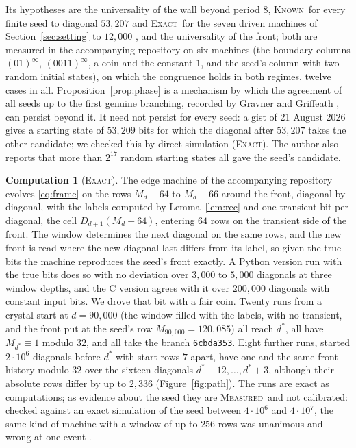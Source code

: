 \documentclass[11pt]{article}
\theoremstyle{definition}
\newtheorem{computation}[theorem]{Computation}
\theoremstyle{remark}
\newcommand{\EXACT}{\textsc{Exact}}
\newcommand{\MEASURED}{\textsc{Measured}}
\newcommand{\KNOWN}{\textsc{Known}}
\newcommand{\dstar}{d^{*}}
\begin{document}
Its hypotheses are the universality of the wall beyond period $8$, \KNOWN\ for every finite seed to diagonal $53{,}207$ \cite[\S8]{GG} and \EXACT\ for the seven driven machines of Section~\ref{sec:setting} to $12{,}000$ \cite{B}, and the universality of the front; both are measured in the accompanying repository on six machines (the boundary columns $(01)^\infty$, $(0011)^\infty$, a coin and the constant $1$, and the seed's column with two random initial states), on which the congruence holds in both regimes, twelve cases in all. Proposition~\ref{prop:phase} is a mechanism by which the agreement of all seeds up to the first genuine branching, recorded by Gravner and Griffeath \cite[\S8]{GG}, can persist beyond it. It need not persist for every seed: a gist of 21 August 2026 \cite{Lania} gives a starting state of $53{,}209$ bits for which the diagonal after $53{,}207$ takes the other candidate; we checked this by direct simulation (\EXACT). The author also reports that more than $2^{17}$ random starting states all gave the seed's candidate.

\begin{computation}[\EXACT]\label{comp:vote}
The edge machine of the accompanying repository evolves \eqref{eq:frame} on the rows $M_d-64$ to $M_d+66$ around the front, diagonal by diagonal, with the labels computed by Lemma~\ref{lem:rec} and one transient bit per diagonal, the cell $D_{d+1}(M_d-64)$, entering $64$ rows on the transient side of the front. The window determines the next diagonal on the same rows, and the new front is read where the new diagonal last differs from its label, so given the true bits the machine reproduces the seed's front exactly. A Python version run with the true bits does so with no deviation over $3{,}000$ to $5{,}000$ diagonals at three window depths, and the C version agrees with it over $200{,}000$ diagonals with constant input bits. We drove that bit with a fair coin. Twenty runs from a crystal start at $d=90{,}000$ (the window filled with the labels, with no transient, and the front put at the seed's row $M_{90{,}000}=120{,}085$) all reach $\dstar$, all have $M_{\dstar}\equiv1$ modulo $32$, and all take the branch \texttt{6cbda353}. Eight further runs, started $2\cdot10^6$ diagonals before $\dstar$ with start rows $7$ apart, have one and the same front history modulo $32$ over the sixteen diagonals $\dstar-12,\dots,\dstar+3$, although their absolute rows differ by up to $2{,}336$ (Figure~\ref{fig:path}). The runs are exact as computations; as evidence about the seed they are \MEASURED\ and not calibrated: checked against an exact simulation of the seed between $4\cdot10^{6}$ and $4\cdot10^{7}$, the same kind of machine with a window of up to $256$ rows was unanimous and wrong at one event \cite{B}.
\end{computation}
\end{document}
